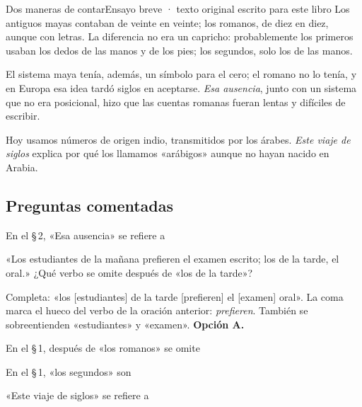 \begin{texto}{Dos maneras de contar}{Ensayo breve · texto original escrito para este libro}
\pa Los antiguos mayas contaban de veinte en veinte; los romanos, de diez en diez, aunque con letras. La diferencia no era un capricho: probablemente los primeros usaban los dedos de las manos y de los pies; los segundos, solo los de las manos.

\pa El sistema maya tenía, además, un símbolo para el cero; el romano no lo tenía, y en Europa esa idea tardó siglos en aceptarse. \emph{Esa ausencia}, junto con un sistema que no era posicional, hizo que las cuentas romanas fueran lentas y difíciles de escribir.

\pa Hoy usamos números de origen indio, transmitidos por los árabes. \emph{Este viaje de siglos} explica por qué los llamamos
«arábigos» aunque no hayan nacido en Arabia.
\end{texto}

\subsection{Preguntas comentadas}
\begin{comentada}{En el \S\,2, «Esa ausencia» se refiere a}
\end{comentada}

\begin{reto}
«Los estudiantes de la mañana prefieren el examen escrito; los de la tarde, el oral.» ¿Qué verbo se omite después de
«los de la tarde»?
\end{reto}

\begin{retoresuelto}
Completa: «los [estudiantes] de la tarde [prefieren] el [examen] oral». La coma marca el hueco del verbo de la oración
anterior: \emph{prefieren}. También se sobreentienden «estudiantes» y «examen». \textbf{Opción A.}
\end{retoresuelto}

\taller
{}
\begin{ejercicios}
\item En el \S\,1, después de «los romanos» se omite
\item En el \S\,1, «los segundos» son
\item «Este viaje de siglos»  se refiere a
\end{ejercicios}

